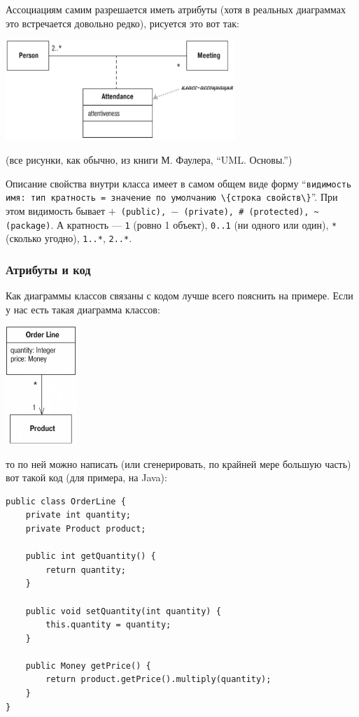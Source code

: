 \documentclass[a5paper]{article}
\begin{document}
Ассоциациям самим разрешается иметь атрибуты (хотя в реальных диаграммах это встречается довольно редко), рисуется это вот так:

\begin{center}
	\includegraphics[width=0.65\textwidth]{classAssociation.png}
\end{center}

(все рисунки, как обычно, из книги М. Фаулера, ``UML. Основы.'')

Описание свойства внутри класса имеет в самом общем виде форму ``\verb|видимость имя: тип кратность = значение по умолчанию \{строка свойств\}|''. При этом видимость бывает \texttt{$+$ (public), $-$ (private), \# (protected), \textasciitilde (package)}. А кратность --- \texttt{1} (ровно 1 объект), \texttt{0..1} (ни одного или один), \texttt{*} (сколько угодно), \texttt{1..*}, \texttt{2..*}.

\subsubsection{Атрибуты и код}

Как диаграммы классов связаны с кодом лучше всего пояснить на примере. Если у нас есть такая диаграмма классов:

\begin{center}
	\includegraphics[width=0.2\textwidth]{orderLine.png}
\end{center}

то по ней можно написать (или сгенерировать, по крайней мере большую часть) вот такой код (для примера, на Java):

\begin{verbatim}
public class OrderLine {
    private int quantity;
    private Product product;

    public int getQuantity() {
        return quantity;
    }

    public void setQuantity(int quantity) {
        this.quantity = quantity;
    }

    public Money getPrice() {
        return product.getPrice().multiply(quantity);
    }
}
\end{verbatim}
\end{document}
